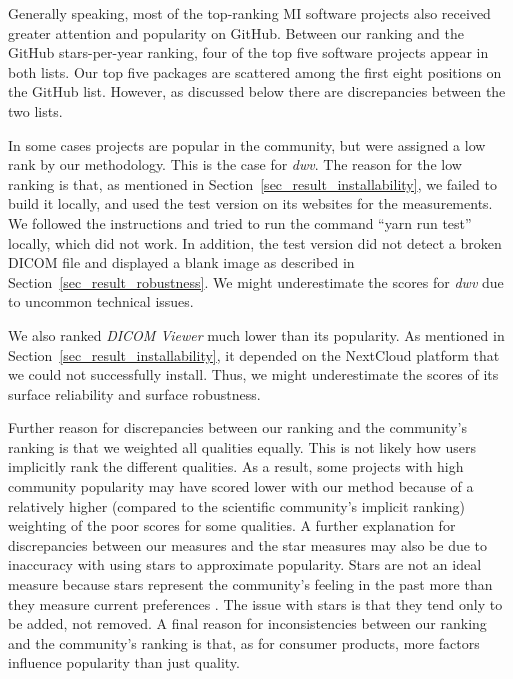 \documentclass[11pt]{article}
\begin{document}
Generally speaking, most of the top-ranking MI software projects also received
greater attention and popularity on GitHub. Between our ranking and the GitHub
stars-per-year ranking, four of the top five software projects appear in both
lists. Our top five packages are scattered among the first eight positions on the
GitHub list. However, as discussed below there are discrepancies between the two
lists.

In some cases projects are popular in the community, but were assigned a low
rank by our methodology.  This is the case for \textit{dwv}. The reason for the
low ranking is that, as mentioned in Section~\ref{sec_result_installability}, we
failed to build it locally, and used the test version on its websites for the
measurements. We followed the instructions and tried to run the command ``yarn
run test'' locally, which did not work. In addition, the test version did not
detect a broken DICOM file and displayed a blank image as described in
Section~\ref{sec_result_robustness}. We might underestimate the scores for
\textit{dwv} due to uncommon technical issues. 

We also ranked \textit{DICOM Viewer} much lower than its popularity. As
mentioned in Section~\ref{sec_result_installability}, it depended on the
NextCloud platform that we could not successfully install. Thus, we might
underestimate the scores of its surface reliability and surface robustness. 

Further reason for discrepancies between our ranking and the community's ranking
is that we weighted all qualities equally. This is not likely how users
implicitly rank the different qualities. As a result, some projects with high
community popularity may have scored lower with our method because of a
relatively higher (compared to the scientific community's implicit ranking)
weighting of the poor scores for some qualities. A further explanation for
discrepancies between our measures and the star measures may also be due to
inaccuracy with using stars to approximate popularity.  Stars are not an ideal
measure because stars represent the community's feeling in the past more than
they measure current preferences \citep{Szulik2017}.  The issue with stars is
that they tend only to be added, not removed.  A final reason for
inconsistencies between our ranking and the community's ranking is that, as for
consumer products, more factors influence popularity than just quality.
\end{document}
